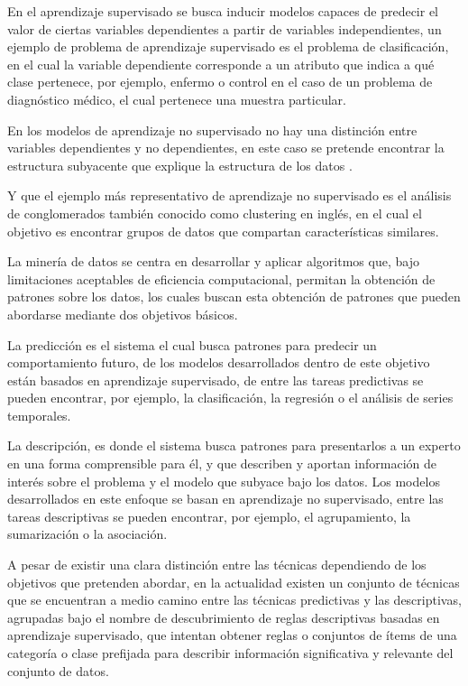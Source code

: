 En el aprendizaje supervisado se busca inducir modelos capaces de predecir el valor de ciertas variables dependientes a partir de variables independientes, un ejemplo de problema de aprendizaje supervisado es el problema de clasificación, en el cual la variable dependiente corresponde a un atributo que indica a qué clase pertenece, por ejemplo, enfermo o control en el caso de un problema de diagnóstico médico, el cual pertenece una muestra particular.

En los modelos de aprendizaje no supervisado no hay una distinción entre variables dependientes y no dependientes, en este caso se pretende encontrar la estructura subyacente que explique la estructura de los datos \cite{gonzalez2015}. 

Y que el ejemplo más representativo de aprendizaje no supervisado es el análisis de conglomerados también conocido como clustering en inglés, en el cual el objetivo es encontrar grupos de datos que compartan características similares.

La minería de datos se centra en desarrollar y aplicar algoritmos que, bajo limitaciones aceptables de eficiencia computacional, permitan la obtención de patrones sobre los datos, los cuales buscan esta obtención de patrones que pueden abordarse mediante dos objetivos básicos.

La predicción es el sistema el cual busca patrones para predecir un comportamiento futuro, de los modelos desarrollados dentro de este objetivo están basados en aprendizaje supervisado, de entre las tareas predictivas se pueden encontrar, por ejemplo, la clasificación, la regresión o el análisis de series temporales.

La descripción, es donde el sistema busca patrones para presentarlos a un experto en una forma comprensible para él, y que describen y aportan información de interés sobre el problema y el modelo que subyace bajo los datos. Los modelos desarrollados en este enfoque se basan en aprendizaje no supervisado, entre las tareas descriptivas se pueden encontrar, por ejemplo, el agrupamiento, la sumarización o la asociación.

A pesar de existir una clara distinción entre las técnicas dependiendo de los objetivos que pretenden abordar, en la actualidad existen un conjunto de técnicas que se encuentran a medio camino entre las técnicas predictivas y las descriptivas, agrupadas bajo el nombre de descubrimiento de reglas descriptivas basadas en aprendizaje supervisado, que intentan obtener reglas o conjuntos de ítems de una categoría o clase prefijada para describir información significativa y relevante del conjunto de datos.

